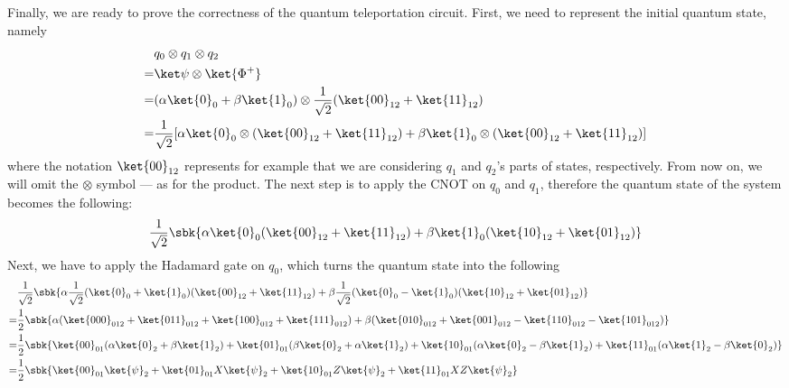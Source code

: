 \documentclass[a4paper, 12pt]{report}
\begin{document}
Finally, we are ready to prove the correctness of the quantum teleportation circuit. First, we need to represent the initial quantum state, namely
\begin{equation*}
	\begin{split}
		  & q_0 \otimes q_1 \otimes q_2                                                                                                                 \\
		= & \ket \psi \otimes \ket{\Phi^+}                                                                                                              \\
		= & (\alpha \ket{0}_{0} + \beta \ket{1}_{0}) \otimes \dfrac{1}{\sqrt 2}(\ket{00}_{12} + \ket{11}_{12})                                          \\
		= & \dfrac{1}{\sqrt 2} [\alpha \ket{0}_{0} \otimes (\ket{00}_{12} + \ket{11}_{12}) + \beta \ket{1}_{0} \otimes (\ket{00}_{12} + \ket{11}_{12})]
	\end{split}
\end{equation*}
where the notation $\ket{00}_{12}$ represents for example that we are considering $q_1$ and $q_2$'s parts of states, respectively. From now on, we will omit the $\otimes$ symbol --- as for the  product. The next step is to apply the CNOT on $q_0$ and $q_1$, therefore the quantum state of the system becomes the following: $$\dfrac{1}{\sqrt 2}\sbk{\alpha \ket{0}_{0} (\ket{00}_{12} + \ket{11}_{12}) + \beta \ket{1}_{0} (\ket{10}_{12} + \ket{01}_{12})}$$ Next, we have to apply the Hadamard gate on $q_0$, which turns the quantum state into the following
\begin{equation*}
	\begin{split}
		  & \dfrac{1}{\sqrt 2} \sbk{
			\alpha \dfrac{1}{\sqrt 2} ( \ket{0}_{0} + \ket{1}_{0} ) ( \ket{00}_{12} + \ket{11}_{12} )
			+ \beta \dfrac{1}{\sqrt 2} ( \ket{0}_{0} - \ket{1}_{0} ) ( \ket{10}_{12} + \ket{01}_{12} )
		}                            \\
		= & \dfrac{1}{2} \sbk{
			\alpha ( \ket{000}_{012} + \ket{011}_{012} + \ket{100}_{012} + \ket{111}_{012} )
			+ \beta ( \ket{010}_{012} + \ket{001}_{012} - \ket{110}_{012} - \ket{101}_{012} )
		}                            \\
		= & \dfrac{1}{2} \sbk{
			\ket{00}_{01} ( \alpha \ket{0}_{2} + \beta \ket{1}_{2} )
			+ \ket{01}_{01} ( \beta \ket{0}_{2} + \alpha \ket{1}_{2} )  + \ket{10}_{01} ( \alpha \ket{0}_{2} - \beta \ket{1}_{2} )
			+ \ket{11}_{01} ( \alpha \ket{1}_{2} - \beta \ket{0}_{2} )
		}                            \\
		= & \dfrac{1}{2} \sbk{
			\ket{00}_{01} \ket{\psi}_{2}
			+ \ket{01}_{01} X \ket{\psi}_{2}
			+ \ket{10}_{01} Z \ket{\psi}_{2}
			+ \ket{11}_{01} XZ \ket{\psi}_{2}
		}
	\end{split}
\end{equation*}
\end{document}
